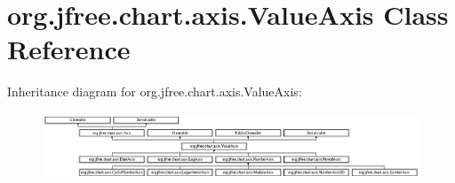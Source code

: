 \hypertarget{classorg_1_1jfree_1_1chart_1_1axis_1_1_value_axis}{}\section{org.\+jfree.\+chart.\+axis.\+Value\+Axis Class Reference}
\label{classorg_1_1jfree_1_1chart_1_1axis_1_1_value_axis}
Inheritance diagram for org.\+jfree.\+chart.\+axis.\+Value\+Axis\+:\begin{figure}[H]
\begin{center}
\leavevmode
\includegraphics[height=1.977401cm]{classorg_1_1jfree_1_1chart_1_1axis_1_1_value_axis}
\end{center}
\end{figure}

